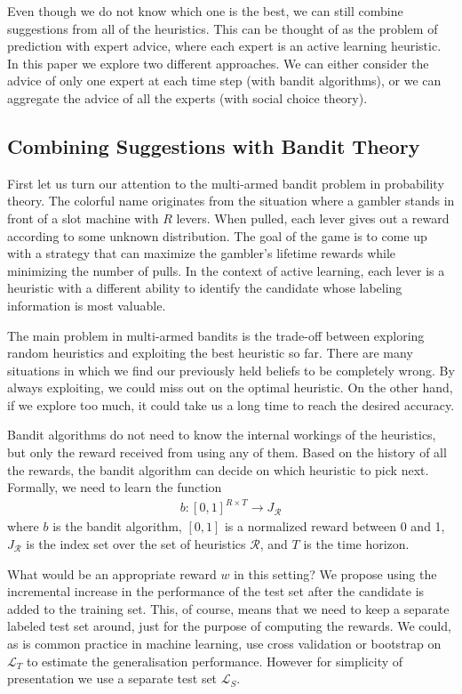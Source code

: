 \documentclass[fleqn,10pt,lineno]{wlpeerj} %
\newcommand{\X}{\mathcal{X}}
\newcommand{\Y}{\mathcal{Y}}
\newcommand{\Labeled}{\mathcal{L}}
\newcommand{\R}{\mathcal{R}}
\begin{document}
Even though we do not know which one is the best, we can still combine
suggestions from all of the heuristics. This can be thought of as the problem
of prediction with expert advice, where each expert is an active learning
heuristic. In this paper we explore two different approaches. We can either
consider the advice of only one expert at each time step (with bandit
algorithms), or we can aggregate the advice of all the experts (with social
choice theory).

\subsection{Combining Suggestions with Bandit Theory}\label{subsec:bandit}

First let us turn our attention to the multi-armed bandit problem in
probability theory. The colorful name originates from the situation where a
gambler stands in front of a slot machine with $R$ levers. When pulled, each
lever gives out a reward according to some unknown distribution. The goal of
the game is to come up with a strategy that can maximize the gambler's lifetime
rewards while minimizing the number of pulls. In the context of active
learning, each lever is a heuristic with a different ability to identify the
candidate whose labeling information is most valuable.

The main problem in multi-armed bandits is the trade-off between exploring
random heuristics and exploiting the best heuristic so far. There are many
situations in which we find our previously held beliefs to be completely wrong.
By always exploiting, we could miss out on the optimal heuristic. On the other
hand, if we explore too much, it could take us a long time to reach the desired
accuracy.

Bandit algorithms do not need to know the internal workings of the heuristics,
but only the reward received from using any of them. Based on the history of
all the rewards, the bandit algorithm can decide on which heuristic to pick
next. Formally, we need to learn the function
\begin{align}
	b : [0, 1]^{R \times T} \rightarrow J_\R
\end{align}
where $b$ is the bandit algorithm, $[0, 1]$ is a normalized reward between
0 and 1, $J_\R$ is the index set over the set of heuristics $\R$, and $T$
is the time horizon.

What would be an appropriate reward $w$ in this setting? We propose using the
incremental increase in the performance of the test set after the candidate is
added to the training set. This, of course, means that we need to keep a
separate labeled test set around, just for the purpose of computing the
rewards.
We could, as is common practice in machine learning, use cross validation or
bootstrap on $\Labeled_T$ to estimate the generalisation performance. However
for simplicity of presentation we use a separate test set $\Labeled_S$.
\end{document}
